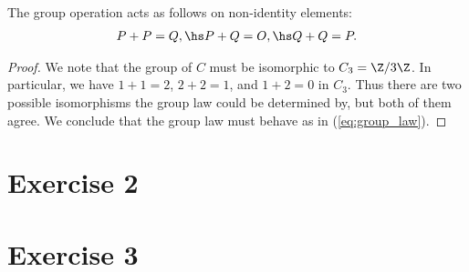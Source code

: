 \documentclass{article}
\begin{document}
\begin{claim*}[3]
  The group operation acts as follows on non-identity elements:
  \begin{align}\label{eq:group_law}
    P+P=Q, \hs P+Q=O, \hs Q+Q=P.
  \end{align}
  \begin{proof}
    We note that the group of $C$ must be isomorphic to $C_3=\Z/3\Z$. In particular,
    we have $1+1=2$, $2+2=1$, and $1+2=0$ in $C_3$. Thus there are two possible
    isomorphisms the group law could be determined by, but both of them agree.
    We conclude that the group law must behave as in (\ref{eq:group_law}).
  \end{proof}
\end{claim*}

\section*{Exercise 2}

\section*{Exercise 3}
\end{document}
